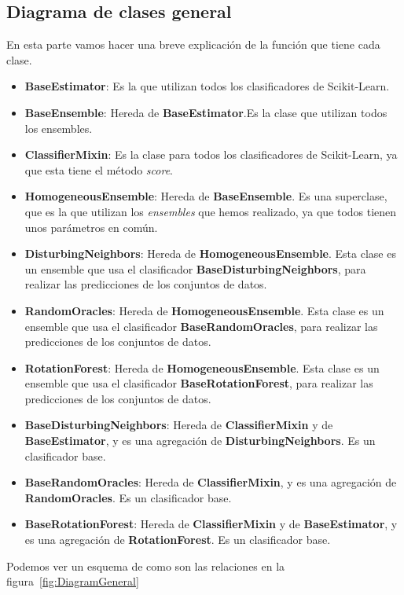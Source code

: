 \subsection{Diagrama de clases general}\label{diagram-general}
En esta parte vamos hacer una breve explicación de la función que tiene cada clase.
\begin{itemize}
	\item \textbf{BaseEstimator}: Es la que utilizan todos los clasificadores de Scikit-Learn.
	\item \textbf{BaseEnsemble}: Hereda de \textbf{BaseEstimator}.Es la clase que utilizan todos los ensembles.
	\item \textbf{ClassifierMixin}: Es la clase para todos los clasificadores de Scikit-Learn, ya que esta tiene el método \textit{score}.
	\item \textbf{HomogeneousEnsemble}: Hereda de \textbf{BaseEnsemble}. Es una superclase, que es la que utilizan los \textit{ensembles}  que hemos realizado, ya que todos tienen unos parámetros en común.
	\item \textbf{DisturbingNeighbors}: Hereda de \textbf{HomogeneousEnsemble}. Esta clase es un ensemble que usa el clasificador \textbf{BaseDisturbingNeighbors}, para realizar las predicciones de los conjuntos de datos.
	\item \textbf{RandomOracles}: Hereda de \textbf{HomogeneousEnsemble}. Esta clase es un ensemble que usa el clasificador \textbf{BaseRandomOracles}, para realizar las predicciones de los conjuntos de datos.
	\item \textbf{RotationForest}: Hereda de \textbf{HomogeneousEnsemble}. Esta clase es un ensemble que usa el clasificador \textbf{BaseRotationForest}, para realizar las predicciones de los conjuntos de datos.
	\item \textbf{BaseDisturbingNeighbors}: Hereda de \textbf{ClassifierMixin} y de \textbf{BaseEstimator}, y es una agregación de \textbf{DisturbingNeighbors}. Es un clasificador base.
	\item \textbf{BaseRandomOracles}: Hereda de \textbf{ClassifierMixin}, y es una agregación de \textbf{RandomOracles}. Es un clasificador base.
	\item \textbf{BaseRotationForest}: Hereda de \textbf{ClassifierMixin} y de \textbf{BaseEstimator}, y es una agregación de \textbf{RotationForest}. Es un clasificador base.
\end{itemize}
Podemos ver un esquema de como son las relaciones en la figura~\ref{fig:DiagramGeneral}

